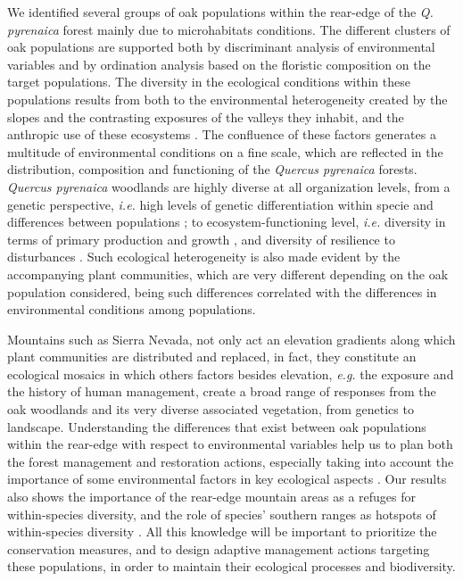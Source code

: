 We identified several groups of oak populations within the rear-edge of the \emph{Q. pyrenaica} forest mainly due to microhabitats conditions. The different clusters of oak populations are supported both by discriminant analysis of environmental variables and by ordination analysis based on the floristic composition on the target populations. The diversity in the ecological conditions within these populations results from both to the environmental heterogeneity created by the slopes and the contrasting exposures of the valleys they inhabit, and the anthropic use of these ecosystems \autocites[\emph{e.g.}][]{NavarroGonzalezetal2013WeightLanduse,PerezLuqueetal2020LanduseLegacies}. The confluence of these factors generates a multitude of environmental conditions on a fine scale, which are reflected in the distribution, composition and functioning of the \emph{Quercus pyrenaica} forests.
\emph{Quercus pyrenaica} woodlands are highly diverse at all organization levels, from a genetic perspective, \emph{i.e.} high levels of genetic differentiation within specie \autocite{ValbuenaCarabanaGil2013GeneticResilience} and differences between populations \autocite{ValbuenaCarabanaGil2011EvaluacionEstructura}; to ecosystem-functioning level, \emph{i.e.} diversity in terms of primary production and growth \autocite{PerezLuqueetal2015OntologicalSystem,AlcarazSeguraetal2016ChangesVegetation}, and diversity of resilience to disturbances \autocite[\emph{e.g.}][]{PerezLuqueetal2020LanduseLegacies}. Such ecological heterogeneity is also made evident by the accompanying plant communities, which are very different depending on the oak population considered, being such differences correlated with the differences in environmental conditions among populations.

Mountains such as Sierra Nevada, not only act an elevation gradients along which plant communities are distributed and replaced, in fact, they constitute an ecological mosaics in which others factors besides elevation, \emph{e.g.} the exposure and the history of human management, create a broad range of responses from the oak woodlands and its very diverse associated vegetation, from genetics to landscape. Understanding the differences that exist between oak populations within the rear-edge with respect to environmental variables help us to plan both the forest management and restoration actions, especially taking into account the importance of some environmental factors in key ecological aspects \autocites[\emph{e.g.} regeneration and growth,][]{GomezAparicioetal2008OakSeedling,PerezLuqueetal2020LanduseLegacies}. Our results also shows the importance of the rear-edge mountain areas as a refuges for within-species diversity, and the role of species' southern ranges as hotspots of within-species diversity \autocite{Jumpetal2010MonitoringManaging,HampeJump2011ClimateRelicts}. All this knowledge will be important to prioritize the conservation measures, and to design adaptive management actions targeting these populations, in order to maintain their ecological processes and biodiversity.
